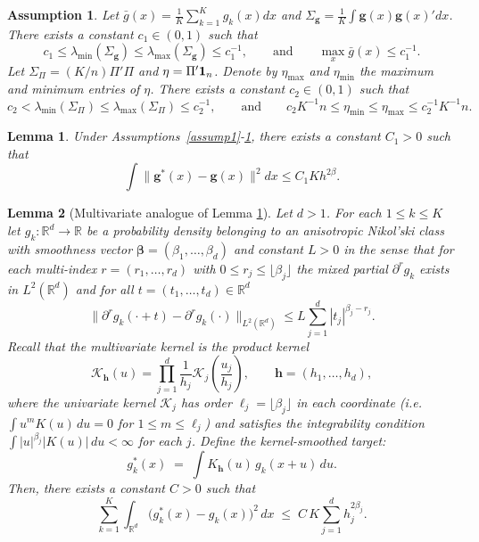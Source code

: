 \documentclass[10pt,a4paper]{amsart}
\newtheorem{assumption}{Assumption}
\newtheorem{lemma}{Lemma}
\newcommand{\mcal}{\mathcal}
\begin{document}
\begin{assumption} \label{assump2}
Let $\bar{g}(x)=\frac{1}{K}\sum_{k=1}^K g_k(x)dx$ and $\Sigma_{\boldsymbol g} = \frac{1}{K}\int {\boldsymbol g}(x) {\boldsymbol g}(x)' dx$. There exists a constant $c_1\in (0,1)$ such that 
\[
c_1\leq \lambda_{\min}(\Sigma_{\boldsymbol g}) \leq \lambda_{\max}(\Sigma_{\boldsymbol g})\leq c_1^{-1}, \qquad\mbox{and}\qquad \max_x \bar{g}(x) \leq c_1^{-1}. 
\]
Let $\Sigma_\Pi = (K/n)\Pi'\Pi$ and $\eta = \Pi'{\bf 1}_n$. Denote by $\eta_{\max}$ and $\eta_{\min}$ the maximum and minimum entries of $\eta$. There exists a constant $c_2\in (0,1)$ such that 
\[
c_2 <\lambda_{\min}(\Sigma_\Pi)\leq \lambda_{\max}(\Sigma_\Pi)\leq c_2^{-1}, \qquad\mbox{and}\qquad c_2K^{-1}n\leq \eta_{\min}\leq \eta_{\max}\leq c^{-1}_2K^{-1}n. 
\]
\end{assumption}

\begin{lemma} \label{lem:error1}
Under Assumptions~\ref{assump1}-\ref{assump2}, there exists a constant $C_1>0$ such that
\[
\int \|{\boldsymbol g}^*(x)-{\boldsymbol g}(x)\|^2dx\leq C_1 Kh^{2\beta}.
\]


\end{lemma}

\begin{lemma}[Multivariate analogue of Lemma \ref{lem:error1}]
\label{lem:multivariate-lemma4.3}
Let $d>1$.  For each $1\le k\le K$ let $g_k:\mathbb{R}^d\to\mathbb{R}$ be a probability density belonging to an \emph{anisotropic Nikol'ski class} with smoothness vector $\boldsymbol{\beta}=(\beta_1,\dots,\beta_d)$ and constant $L>0$ in the sense that for each multi-index $r=(r_1,\dots,r_d)$ with $0\le r_j\le\lfloor\beta_j\rfloor$ the mixed partial $\partial^r g_k$ exists in $L^2(\mathbb{R}^d)$ and for all $t=(t_1,\dots,t_d)\in\mathbb{R}^d$
\[
\Big\| \partial^r g_k(\cdot + t) - \partial^r g_k(\cdot)\Big\|_{L^2(\mathbb{R}^d)}
\le L \sum_{j=1}^d |t_j|^{\beta_j - r_j} .
\]
Recall that the multivariate kernel is the product kernel
\[
\mcal{K}_{\mathbf{h}}(u) = \prod_{j=1}^d \frac{1}{h_j} \mcal{K}_j\!\left(\frac{u_j}{h_j}\right),\qquad \mathbf{h}=(h_1,\dots,h_d),
\]
where the univariate kernel $\mcal{K}_j$ has order $\ell_j=\lfloor\beta_j\rfloor$ in each coordinate (i.e.\ $\int u^m K(u)\,du=0$ for $1\le m\le \ell_j$) and satisfies the integrability condition $\int |u|^{\beta_j}|K(u)|\,du<\infty$ for each $j$. Define the kernel-smoothed target:
\[
g_k^*(x) \;=\; \int K_{\mathbf{h}}(u)\, g_k(x+u)\,du .
\]
Then, there exists a constant $C>0$ such that
\[
\sum_{k=1}^K \int_{\mathbb{R}^d} \big( g_k^*(x) - g_k(x) \big)^2 \,dx
\;\le\; C \, K \sum_{j=1}^d h_j^{2\beta_j}.
\]
\end{lemma}
\end{document}
